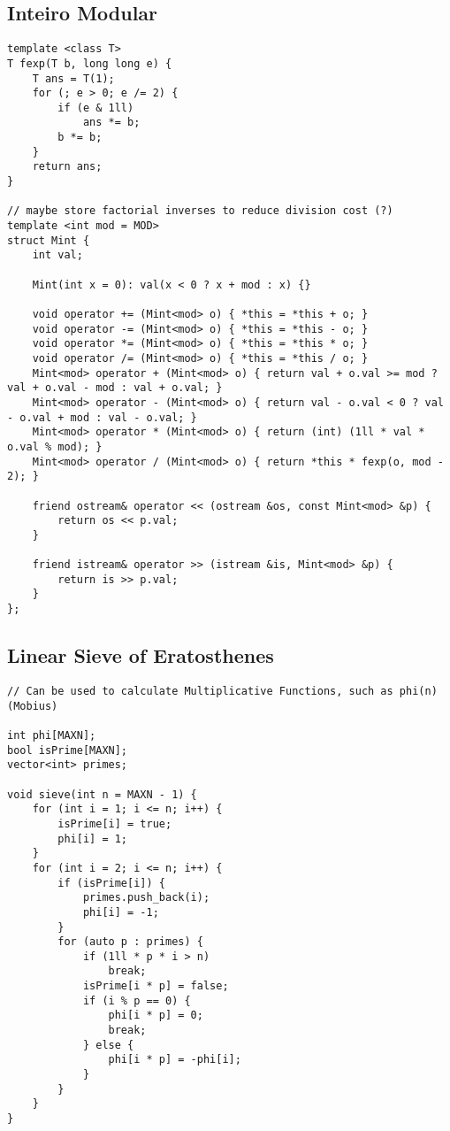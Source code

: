 \documentclass[12pt, a4paper, twoside]{article}
\begin{document}
\subsection{Inteiro Modular
}
\begin{lstlisting}
template <class T>
T fexp(T b, long long e) {
	T ans = T(1);
	for (; e > 0; e /= 2) {
		if (e & 1ll)
			ans *= b;
		b *= b;
	}
	return ans;
}

// maybe store factorial inverses to reduce division cost (?)
template <int mod = MOD>
struct Mint {
	int val;

	Mint(int x = 0): val(x < 0 ? x + mod : x) {}

	void operator += (Mint<mod> o) { *this = *this + o; }
	void operator -= (Mint<mod> o) { *this = *this - o; }
	void operator *= (Mint<mod> o) { *this = *this * o; }
	void operator /= (Mint<mod> o) { *this = *this / o; }
	Mint<mod> operator + (Mint<mod> o) { return val + o.val >= mod ? val + o.val - mod : val + o.val; }
	Mint<mod> operator - (Mint<mod> o) { return val - o.val < 0 ? val - o.val + mod : val - o.val; }
	Mint<mod> operator * (Mint<mod> o) { return (int) (1ll * val * o.val % mod); }
	Mint<mod> operator / (Mint<mod> o) { return *this * fexp(o, mod - 2); }

	friend ostream& operator << (ostream &os, const Mint<mod> &p) {
		return os << p.val;
	}

	friend istream& operator >> (istream &is, Mint<mod> &p) {
		return is >> p.val;
	}
};
\end{lstlisting}

\subsection{Linear Sieve of Eratosthenes
}
\begin{lstlisting}
// Can be used to calculate Multiplicative Functions, such as phi(n) (Mobius)

int phi[MAXN];
bool isPrime[MAXN];
vector<int> primes;

void sieve(int n = MAXN - 1) {
	for (int i = 1; i <= n; i++) {
		isPrime[i] = true;
		phi[i] = 1;
	}
	for (int i = 2; i <= n; i++) {
		if (isPrime[i]) {
			primes.push_back(i);
			phi[i] = -1;
		}
		for (auto p : primes) {
			if (1ll * p * i > n)
				break;
			isPrime[i * p] = false;
			if (i % p == 0) {
				phi[i * p] = 0;
				break;
			} else {
				phi[i * p] = -phi[i];
			}
		}
	}
}
\end{lstlisting}
\end{document}
